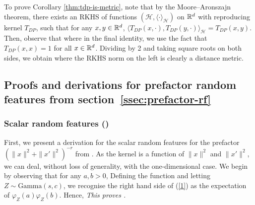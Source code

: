 To prove Corollary \ref{thm:tdp-is-metric}, note that by the Moore--Aronszajn theorem, there exists an RKHS of functions $(\mathcal H, \langle\cdot\rangle_\mathcal{H})$ on $\mathbb{R}^d$ with reproducing kernel $T_{DP}$, such that for any $x,y\in\mathbb{R}^d$, $\langle T_{DP}(x,\cdot), T_{DP}(y,\cdot) \rangle_\mathcal{H} = T_{DP}(x,y)$. Then, observe that 
where in the final identity, we use the fact that $T_{DP}(x,x)=1$ for all $x\in\mathbb{R}^d$. Dividing by 2 and taking square roots on both sides, we obtain
where the RKHS norm on the left is clearly a distance metric. 

\subsection{Proofs and derivations for prefactor random features from section~\ref{ssec:prefactor-rf}}
\label{apdx:prefactor-sketch}

\subsubsection{Scalar random features ()}
First, we present a derivation for the scalar random features for the prefactor $(\|x\|^2+\|x'\|^2)^{-r}$ from .
As the kernel is a function of $\|x\|^2$ and $\|x'\|^2$, we can deal, without loss of generality, with the one-dimensional case. We begin by observing that for any $a,b>0$,
Defining the function
and letting $Z\sim\text{Gamma}(s,c)$, we recognise the right hand side of (\ref{1}) as the expectation of $\varphi_Z(a)\varphi_Z(b)$. Hence, 
\emph{This proves .}


